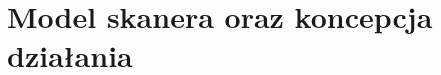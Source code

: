 \begingroup
\newpage

\let\clearpage\relax
\chapter{Model skanera oraz koncepcja działania}




\endgroup